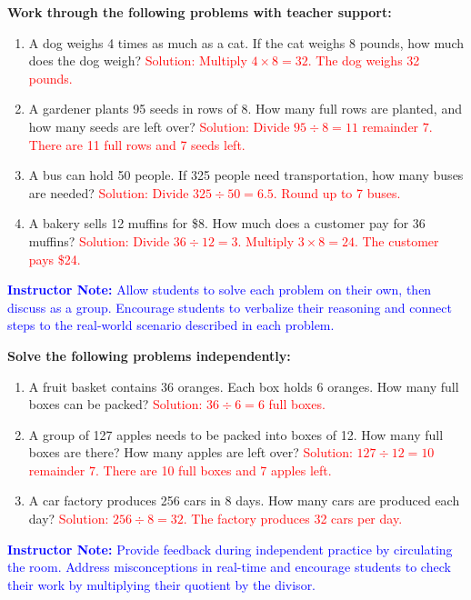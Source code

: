 \documentclass[12pt]{article}
\begin{document}
\begin{tcolorbox}[colframe=black!60, colback=white, 
coltitle=black, colbacktitle=black!15, fonttitle=\bfseries\Large, 
title=Guided Practice, halign title=center, left=10pt, right=10pt, top=10pt, bottom=15pt]
\textbf{Work through the following problems with teacher support:}
\begin{enumerate}[itemsep=3em]
    \item A dog weighs 4 times as much as a cat. If the cat weighs 8 pounds, how much does the dog weigh? 
    \textcolor{red}{Solution: Multiply \( 4 \times 8 = 32 \). The dog weighs 32 pounds.}
    \item A gardener plants 95 seeds in rows of 8. How many full rows are planted, and how many seeds are left over? 
    \textcolor{red}{Solution: Divide \( 95 \div 8 = 11 \) remainder \( 7 \). There are 11 full rows and 7 seeds left.}
    \item A bus can hold 50 people. If 325 people need transportation, how many buses are needed? 
    \textcolor{red}{Solution: Divide \( 325 \div 50 = 6.5 \). Round up to 7 buses.}
    \item A bakery sells 12 muffins for \$8. How much does a customer pay for 36 muffins? 
    \textcolor{red}{Solution: Divide \( 36 \div 12 = 3 \). Multiply \( 3 \times 8 = 24 \). The customer pays \$24.}
\end{enumerate}

\textcolor{blue}{\textbf{Instructor Note:} Allow students to solve each problem on their own, then discuss as a group. Encourage students to verbalize their reasoning and connect steps to the real-world scenario described in each problem.}
\end{tcolorbox}

\begin{tcolorbox}[colframe=black!60, colback=white, 
coltitle=black, colbacktitle=black!15, fonttitle=\bfseries\Large, 
title=Independent Practice, halign title=center, left=10pt, right=10pt, top=10pt, bottom=15pt]
\textbf{Solve the following problems independently:}
\begin{enumerate}[itemsep=3em]
    \item A fruit basket contains 36 oranges. Each box holds 6 oranges. How many full boxes can be packed? 
    \textcolor{red}{Solution: \( 36 \div 6 = 6 \) full boxes.}
    \item A group of 127 apples needs to be packed into boxes of 12. How many full boxes are there? How many apples are left over? 
    \textcolor{red}{Solution: \( 127 \div 12 = 10 \) remainder \( 7 \). There are 10 full boxes and 7 apples left.}
    \item A car factory produces 256 cars in 8 days. How many cars are produced each day? 
    \textcolor{red}{Solution: \( 256 \div 8 = 32 \). The factory produces 32 cars per day.}
\end{enumerate}

\textcolor{blue}{\textbf{Instructor Note:} Provide feedback during independent practice by circulating the room. Address misconceptions in real-time and encourage students to check their work by multiplying their quotient by the divisor.}
\end{tcolorbox}
\end{document}
